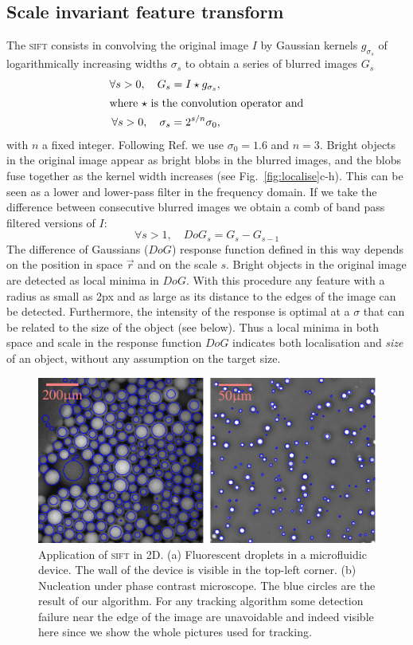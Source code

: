 \documentclass[8.5pt,twoside,twocolumn]{article}
\begin{document}
\subsection{Scale invariant feature transform} \label{sec:blur}
The \textsc{sift} consists in convolving the original image $I$ by Gaussian kernels $g_{\sigma_s}$ of logarithmically increasing widths $\sigma_s$ to obtain a series of blurred images $G_s$
\begin{align}
\forall s>0,\quad G_s = I \star g_{\sigma_s}, \label{eq:gaussian_blur}\\
\intertext{where $\star$ is the convolution operator and}
\forall s>0,\quad \sigma_{s} = 2^{s/n} \sigma_0 ,
\label{eq:sigma_s}
\end{align}
with $n$ a fixed integer. Following Ref. \cite{Lowe2004} we use $\sigma_0=1.6$ and $n=3$. Bright objects in the original image appear as bright blobs in the blurred images, and the blobs fuse together as the kernel width increases (see Fig.~\ref{fig:localise}c-h). This can be seen as a lower and lower-pass filter in the frequency domain. If we take the difference between consecutive blurred images we obtain a comb of band pass filtered versions of $I$: 
\begin{equation}
\forall s>1,\quad DoG_s = G_s - G_{s-1} \label{eq:DoG_s}
\end{equation}
The difference of Gaussians ($DoG$) response function defined in this way depends on the position in space $\vec{r}$ and on the scale $s$. Bright objects in the original image are detected as local minima in $DoG$. With this procedure any feature with a radius as small as \unit{2}{px} and as large as its distance to the edges of the image can be detected. Furthermore, the intensity of the response is optimal at a $\sigma$ that can be related to the size of the object (see below). Thus a local minima in both space and scale in the response function $DoG$ indicates both localisation and \emph{size} of an object, without any assumption on the target size.

\begin{figure}
	\centering
	\includegraphics{fig_applications.pdf}
	\caption{Application of \textsc{sift} in 2D. (a) Fluorescent droplets in a microfluidic device. The wall of the device is visible in the top-left corner. 
	(b) Nucleation under phase contrast microscope. The blue circles are the result of our algorithm. For any tracking algorithm some detection failure near the edge of the image are unavoidable and indeed visible here since we show the whole pictures used for tracking.}
	\label{fig:applications}
\end{figure}
\end{document}
